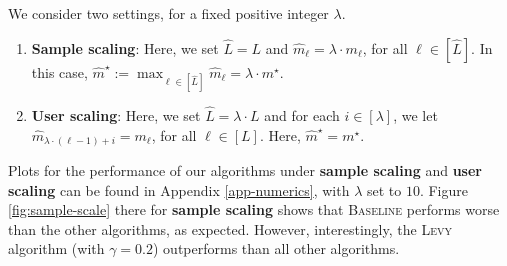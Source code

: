 
We consider two settings, for a fixed positive integer $\lambda$.
\begin{enumerate}
	\item \textbf{Sample scaling}: Here, we set $\widehat{L} = L$ and $\widehat{m}_\ell = \lambda \cdot m_\ell$, for all $\ell\in [\widehat{L}]$. In this case, $\widehat{m}^\star := \max_{\ell\in [\widehat{L}]} \widehat{m}_\ell = \lambda\cdot m^\star$. 
	\item \textbf{User scaling}: Here, we set $\widehat{L} = \lambda\cdot L$ and for each $i\in [\lambda]$, we let $\widehat{m}_{\lambda\cdot(\ell-1)+i} = m_\ell$,  for all $\ell\in [{L}]$. Here, $\widehat{m}^\star = m^\star$.
\end{enumerate}
Plots for the performance of our algorithms under \textbf{sample scaling} and \textbf{user scaling} can be found in {Appendix} \ref{app-numerics}, with $\lambda$ set to $10$. 
Figure \ref{fig:sample-scale} there for \textbf{sample scaling} shows that \textsc{Baseline} performs worse than the other algorithms, as expected. However, interestingly, the \textsc{Levy} algorithm (with $\gamma = 0.2$) outperforms than all other algorithms. 


